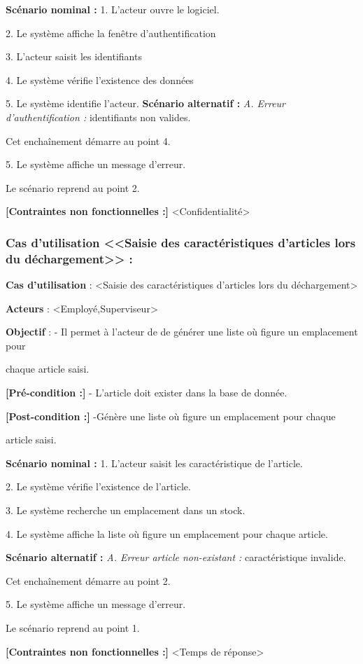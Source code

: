 	\textbf{Scénario nominal :}  1. L'acteur ouvre le logiciel.
	  
    2. Le système affiche la fenêtre d'authentification
      
    3. L'acteur saisit les identifiants
    
    4. Le système vérifie l'existence des données
     
    5. Le système identifie l'acteur.  
    \clearpage
    \textbf{Scénario alternatif :} \textit{A. Erreur d'authentification :} identifiants non valides. 
    
Cet enchaînement démarre au point 4.
   
5. Le système affiche un message d'erreur. 

Le scénario reprend au point 2.

\textbf{[Contraintes non fonctionnelles :] } <Confidentialité> 
    
    \subsubsection*{Cas d'utilisation <<Saisie des caractéristiques d'articles lors du déchargement>> :}
	\textbf{Cas d'utilisation} :  <Saisie des caractéristiques d'articles lors du déchargement>
	
	\textbf{Acteurs} :  <Employé,Superviseur>
	
	\textbf{Objectif} : - Il permet à l'acteur de 	de générer une liste où figure un emplacement 	pour 
	
	chaque article saisi.
	
	\textbf{[Pré-condition :]}  - L'article doit 	exister dans la base de donnée.
	
	\textbf{[Post-condition :]}  -Génère une 			liste où figure un emplacement pour chaque 
	
	article saisi.
	
	\textbf{Scénario nominal :} 1. L'acteur 			saisit les caractéristique de l'article.
    
    2. Le système vérifie l'existence de 				l'article.
    
     3. Le système recherche un emplacement dans 		un stock.
     
    4. Le système affiche la liste où figure un emplacement pour chaque article.  
    
    \textbf{Scénario alternatif :} \textit{A. Erreur article non-existant :} caractéristique invalide. 
    
Cet enchaînement démarre au point 2.
   
5. Le système affiche un message d'erreur. 

Le scénario reprend au point 1.

\textbf{[Contraintes non fonctionnelles :] } <Temps de réponse>

